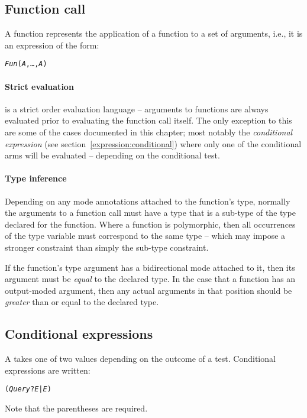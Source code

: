 \subsection{Function call}
\label{expression:applicative}
A function represents the application of a function to a set of arguments, i.e., it is an expression of the form:
\begin{alltt}
\emph{Fun}(\emph{A},\ldots,\emph{A\subn})
\end{alltt}

\paragraph{Strict evaluation}
\go is a strict order evaluation language -- arguments to functions are always evaluated prior to evaluating the function call itself. The only exception to this are some of the cases documented in this chapter; most notably the \emph{conditional expression} (see section~\vref{expression:conditional}) where only one of the conditional arms will be evaluated -- depending on the conditional test.

\paragraph{Type inference}
Depending on any mode annotations attached to the function's type, normally the arguments to a function call must have a type that is a sub-type of the type declared for the function. Where a function is polymorphic, then all occurrences of the type variable must correspond to the same type -- which may impose a stronger constraint than simply the sub-type constraint.

If the function's type argument has a bidirectional mode attached to it, then its argument must be \emph{equal} to the declared type. In the case that a function has an output-moded argument, then any actual arguments in that position should be \emph{greater} than or equal to the declared type.

\subsection{Conditional expressions}
\label{expression:conditional}

A  takes one of two values depending on the outcome of a test. Conditional expressions are written:
\begin{alltt}
(\emph{Query}?\emph{E}|\emph{E})
\end{alltt}
Note that the parentheses are required. 

